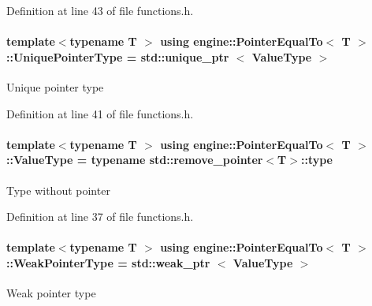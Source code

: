 Definition at line 43 of file functions.\+h.

\paragraph[{\texorpdfstring{Unique\+Pointer\+Type}{UniquePointerType}}]{\setlength{\rightskip}{0pt plus 5cm}template$<$typename T $>$ using {\bf engine\+::\+Pointer\+Equal\+To}$<$ T $>$\+::{\bf Unique\+Pointer\+Type} =  std\+::unique\+\_\+ptr $<$ {\bf Value\+Type} $>$}\hypertarget{a00062_ad16a216e6217ae2f08c95f03fdd245cc}{}\label{a00062_ad16a216e6217ae2f08c95f03fdd245cc}
Unique pointer type 

Definition at line 41 of file functions.\+h.

\paragraph[{\texorpdfstring{Value\+Type}{ValueType}}]{\setlength{\rightskip}{0pt plus 5cm}template$<$typename T $>$ using {\bf engine\+::\+Pointer\+Equal\+To}$<$ T $>$\+::{\bf Value\+Type} =  typename std\+::remove\+\_\+pointer$<$T$>$\+::type}\hypertarget{a00062_af485b6182246602f97c4f0bef182f799}{}\label{a00062_af485b6182246602f97c4f0bef182f799}
Type without pointer 

Definition at line 37 of file functions.\+h.

\paragraph[{\texorpdfstring{Weak\+Pointer\+Type}{WeakPointerType}}]{\setlength{\rightskip}{0pt plus 5cm}template$<$typename T $>$ using {\bf engine\+::\+Pointer\+Equal\+To}$<$ T $>$\+::{\bf Weak\+Pointer\+Type} =  std\+::weak\+\_\+ptr $<$ {\bf Value\+Type} $>$}\hypertarget{a00062_ac6a2979606d67d0c973d3f73e7730651}{}\label{a00062_ac6a2979606d67d0c973d3f73e7730651}
Weak pointer type 

